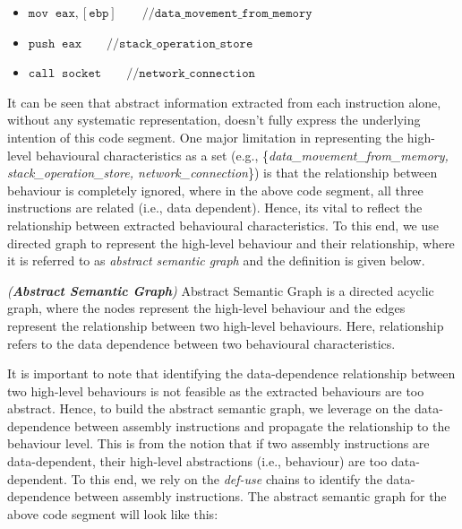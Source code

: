 \begin{itemize}
\itemsep0em 
  \item[] $\mathtt{mov \;\; eax, [ebp] \quad\quad// data\_movement\_from\_memory}$
  \item[] $\mathtt{push \;\; eax \quad\quad// stack\_operation\_store}$
  \item[] $\mathtt{call \;\; socket \quad\quad// network\_connection}$
\end{itemize}
 
It can be seen that abstract information extracted from each instruction alone, without any systematic representation, doesn't fully express the underlying intention of this code segment. One major limitation in representing the high-level behavioural characteristics  as a set (e.g., 
\{\textit{data\_movement\_from\_memory, stack\_operation\_store, network\_connection}\}) is that the relationship between behaviour is completely ignored, where in the above code segment, all three instructions are related (i.e., data dependent). Hence, its vital to reflect the relationship between extracted behavioural characteristics. To this end, we use directed graph to represent the high-level behaviour and their relationship, where it is referred to as \textit{abstract semantic graph} and the definition is given below.

\begin{mydef}
\emph{(\textbf{Abstract Semantic Graph}) }  Abstract Semantic Graph is a directed acyclic graph, where the nodes represent the high-level behaviour and the edges represent the relationship between two high-level behaviours. Here, relationship refers to the data dependence between two behavioural characteristics.
\end{mydef}

It is important to note that identifying the data-dependence relationship between two high-level behaviours is not feasible as the extracted behaviours are too abstract. Hence, to build the abstract semantic graph, we leverage on the data-dependence between assembly instructions and propagate the relationship to the behaviour level. This is from the notion that if two assembly instructions are data-dependent, their high-level abstractions (i.e., behaviour) are too data-dependent. To this end, we rely on the \textit{def-use} chains to identify the data-dependence between assembly instructions. The abstract semantic graph for the above code segment will look like this: 

